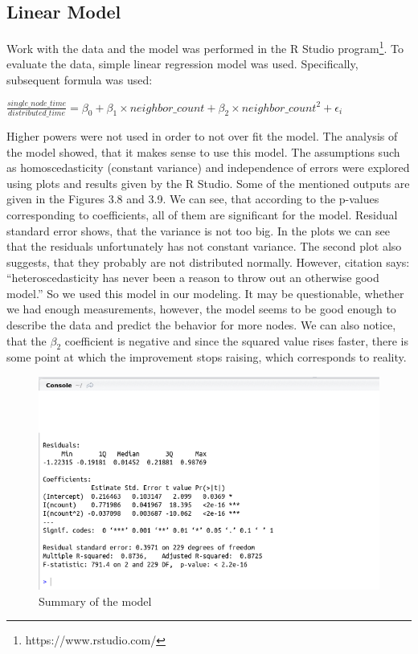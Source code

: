 \pagebreak

\subsection{Linear Model}\label{linear-model}

Work with the data and the model was performed in the R Studio
program\footnote{https://www.rstudio.com/}. To evaluate the data, simple
linear regression model was used. Specifically, subsequent formula was
used:

\begin{center}
$\frac{single\_node\_time}{distributed\_time} = \beta_0 + \beta_1 \times neighbor\_count + \beta_2 \times neighbor\_count^2 + \epsilon_i$
\end{center}

Higher powers were not used in order to not over fit the model. The
analysis of the model showed, that it makes sense to use this model. The
assumptions such as homoscedasticity (constant variance) and
independence of errors were explored using plots and results given by
the R Studio. Some of the mentioned outputs are given in the Figures 3.8
and 3.9. We can see, that according to the p-values corresponding to
coefficients, all of them are significant for the model. Residual
standard error shows, that the variance is not too big. In the plots we
can see that the residuals unfortunately has not constant variance. The
second plot also suggests, that they probably are not distributed
normally. However, citation says: ``heteroscedasticity has never been a
reason to throw out an otherwise good model.''\citep{ECON} So we used
this model in our modeling. It may be questionable, whether we had
enough measurements, however, the model seems to be good enough to
describe the data and predict the behavior for more nodes. We can also
notice, that the $\beta_2$ coefficient is negative and since the squared
value rises faster, there is some point at which the improvement stops
raising, which corresponds to reality.

\begin{figure}[h]
\begin{center}
\includegraphics[scale=0.60]{./img/model.png}
\caption{Summary of the model}
\end{center}
\end{figure}

